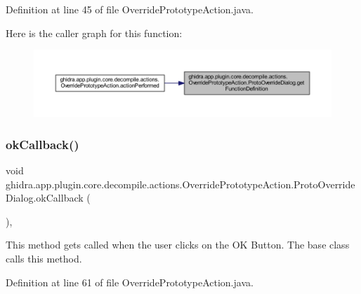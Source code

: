 Definition at line 45 of file Override\+Prototype\+Action.\+java.

Here is the caller graph for this function\+:
\nopagebreak
\begin{figure}[H]
\begin{center}
\leavevmode
\includegraphics[width=350pt]{classghidra_1_1app_1_1plugin_1_1core_1_1decompile_1_1actions_1_1_override_prototype_action_1_1_proto_override_dialog_a00d5c5714668d6a38bbc1059a2f3fd4d_icgraph}
\end{center}
\end{figure}
\mbox{\label{classghidra_1_1app_1_1plugin_1_1core_1_1decompile_1_1actions_1_1_override_prototype_action_1_1_proto_override_dialog_aaf58728fc063b0a5129eb42f007ff6c1}} 
\subsubsection{\texorpdfstring{okCallback()}{okCallback()}}
{\footnotesize\ttfamily void ghidra.\+app.\+plugin.\+core.\+decompile.\+actions.\+Override\+Prototype\+Action.\+Proto\+Override\+Dialog.\+ok\+Callback (\begin{DoxyParamCaption}{ }\end{DoxyParamCaption})\hspace{0.3cm}{\ttfamily [inline]}, {\ttfamily [protected]}}

This method gets called when the user clicks on the OK Button. The base class calls this method. 

Definition at line 61 of file Override\+Prototype\+Action.\+java.

